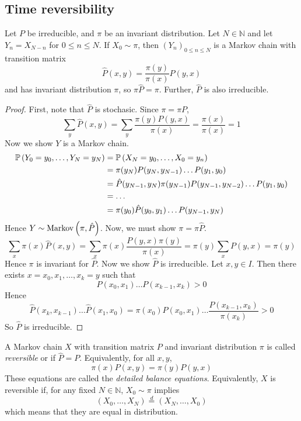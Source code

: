 \subsection{Time reversibility}
\begin{theorem}
	Let \( P \) be irreducible, and \( \pi \) be an invariant distribution.
	Let \( N \in \mathbb N \) and let \( Y_n = X_{N-n} \) for \( 0 \leq n \leq N \).
	If \( X_0 \sim \pi \), then \( (Y_n)_{0 \leq n \leq N} \) is a Markov chain with transition matrix
	\[
		\hat P(x,y) = \frac{\pi(y)}{\pi(x)} P(y,x)
	\]
	and has invariant distribution \( \pi \), so \( \pi \hat P = \pi \).
	Further, \( \hat P \) is also irreducible.
\end{theorem}
\begin{proof}
	First, note that \( \hat P \) is stochasic.
	Since \( \pi = \pi P \),
	\[
		\sum_y \hat P(x,y) = \sum_y \frac{\pi(y) P(y,x)}{\pi(x)} = \frac{\pi(x)}{\pi(x)} = 1
	\]
	Now we show \( Y \) is a Markov chain.
	\begin{align*}
		\mathbb{P}\left({Y_0 = y_0, \dots, Y_N = y_N}\right) & = \mathbb{P}\left({X_N = y_0, \dots, X_0 = y_n}\right)                                      \\
		                                   & = \pi(y_N) P(y_N, y_{N-1}) \dots P(y_1, y_0)                              \\
		                                   & = \hat P(y_{N-1}, y_N) \pi(y_{N-1}) P(y_{N-1}, y_{N-2}) \dots P(y_1, y_0) \\
		                                   & = \dots                                                                   \\
		                                   & = \pi(y_0) \hat P(y_0, y_1) \dots P(y_{N-1}, y_N)
	\end{align*}
	Hence \( Y \sim \operatorname{Markov}\left({\pi, \hat P}\right) \).
	Now, we must show \( \pi = \pi \hat P \).
	\[
		\sum_x \pi(x) \hat P(x,y) = \sum_x \pi(x) \frac{P(y,x) \pi(y)}{\pi(x)} = \pi(y) \sum_x P(y,x) = \pi(y)
	\]
	Hence \( \pi \) is invariant for \( \hat P \).
	Now we show \( \hat P \) is irreducible.
	Let \( x,y \in I \).
	Then there exists \( x = x_0, x_1, \dots, x_k = y \) such that
	\[
		P(x_0, x_1) \dots P(x_{k-1}, x_k) > 0
	\]
	Hence
	\[
		\hat P(x_k, x_{k-1}) \dots \hat P(x_1, x_0) = \pi(x_0) P(x_0, x_1) \dots \frac{P(x_{k-1}, x_k)}{\pi(x_k)} > 0
	\]
	So \( \hat P \) is irreducible.
\end{proof}
\begin{definition}
	A Markov chain \( X \) with transition matrix \( P \) and invariant distribution \( \pi \) is called \textit{reversible} or  if \( \hat P = P \).
	Equivalently, for all \( x, y \),
	\[
		\pi(x) P(x,y) = \pi(y) P(y,x)
	\]
	These equations are called the \textit{detailed balance equations}.
	Equivalently, \( X \) is reversible if, for any fixed \( N \in \mathbb N \), \( X_0 \sim \pi \) implies
	\[
		(X_0, \dots, X_N) \overset{d}{=} (X_N, \dots, X_0)
	\]
	which means that they are equal in distribution.
\end{definition}
